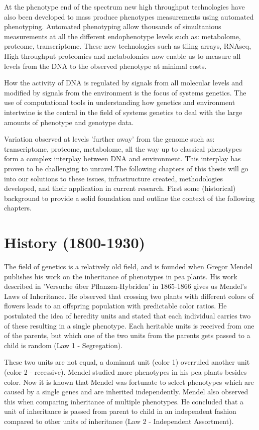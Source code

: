 At the phenotype end of the spectrum new high throughput technologies have also 
been developed to mass produce phenotypes measurements using automated phenotyping. 
Automated phenotyping allow thousands of simultanious measurements at all the 
different endophenotype levels such as: metabolome, proteome, transcriptome. These 
new technologies such as tiling arrays, RNAseq, High throughput proteomics and 
metabolomics now enable us to measure all levels from the DNA to the observed 
phenotype at minimal costs.

How the activity of DNA is regulated by signals from all molecular levels and modified by 
signals from the environment is the focus of systems genetics. The use of computational 
tools in understanding how genetics and environment intertwine is the central in the 
field of systems genetics to deal with the large amounts of phenotype and genotype data.

Variation observed at levels 'further away' from the genome such as: transcriptome, 
proteome, metabolome, all the way up to classical phenotypes form a complex interplay 
between DNA and environment. This interplay has proven to be challenging to unravel.The 
following chapters of this thesis will go into our solutions to these issues, 
infrastructure created, methodologies developed, and their application in current 
research. First some (historical) background to provide a solid foundation  and outline
the context of the following chapters.

\section{History (1800-1930)}

The field of genetics is a relatively old field, and is founded when Gregor 
Mendel publishes his work on the inheritance of phenotypes in pea plants. 
His work described in 'Versuche \"uber Pflanzen-Hybriden' in 1865-1866 
\cite{Mendel:1866} gives us Mendel's Laws of Inheritance. He observed that 
crossing two plants with different colors of flowers leads to an offspring 
population with predictable color ratios. He postulated the idea of heredity 
units and stated that each individual carries two of these resulting in a 
single phenotype. Each heritable units is received from one of the parents, 
but which one of the two units from the parents gets passed to a child is random 
(Law 1 - Segregation).

These two units are not equal, a dominant unit (color 1) overruled another 
unit (color 2 - recessive). Mendel studied more phenotypes in his pea plants 
besides color. Now it is known that Mendel was fortunate to select 
phenotypes which are caused by a single genes and are inherited independently. 
Mendel also observed this when comparing inheritance of multiple phenotypes. 
He concluded that a unit of inheritance is passed from parent to child in an 
independent fashion compared to other units of inheritance 
(Law 2 - Independent Assortment).

